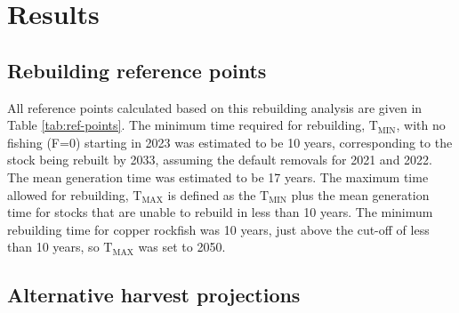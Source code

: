 \documentclass[11pt,
  english,
  a4paper,
]{article}
\begin{document}
\leavevmode\tagmcend\tagstructend\par


\hypertarget{results}{%
\section{Results}\label{results}}

\leavevmode\tagmcend\tagstructend


\hypertarget{rebuilding-reference-points}{%
\subsection{Rebuilding reference points}\label{rebuilding-reference-points}}

\leavevmode\tagmcend\tagstructend


All reference points calculated based on this rebuilding analysis are given in Table \ref{tab:ref-points}. The minimum time required for rebuilding, {\(\text{T}_\text{MIN}\)\leavevmode\tagmcend\tagstructend}, with no fishing (F=0) starting in 2023 was estimated to be 10 years, corresponding to the stock being rebuilt by 2033, assuming the default removals for 2021 and 2022. The mean generation time was estimated to be 17 years. The maximum time allowed for rebuilding, {\(\text{T}_\text{MAX}\)\leavevmode\tagmcend\tagstructend} is defined as the {\(\text{T}_\text{MIN}\)\leavevmode\tagmcend\tagstructend} plus the mean generation time for stocks that are unable to rebuild in less than 10 years. The minimum rebuilding time for copper rockfish was 10 years, just above the cut-off of less than 10 years, so {\(\text{T}_\text{MAX}\)\leavevmode\tagmcend\tagstructend} was set to 2050.

\leavevmode\tagmcend\tagstructend\par


\hypertarget{alternative-harvest-projections}{%
\subsection{Alternative harvest projections}\label{alternative-harvest-projections}}
\end{document}
